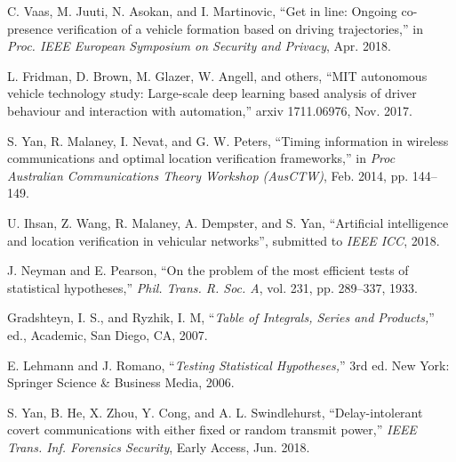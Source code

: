 \documentclass[journal]{IEEEtran}
\begin{document}
\begin{thebibliography}{1}
 C. Vaas, M. Juuti, N. Asokan, and I. Martinovic, ``Get in line: Ongoing co-presence verification of a vehicle formation based on driving trajectories,'' in \textit{Proc. IEEE European Symposium on Security and Privacy}, Apr. 2018.

 L. Fridman, D. Brown, M. Glazer, W. Angell, and others, ``MIT autonomous vehicle technology study: Large-scale deep learning based analysis of driver behaviour and interaction with automation,'' arxiv 1711.06976, Nov. 2017.

 S. Yan, R. Malaney, I. Nevat, and G. W. Peters, ``Timing information in wireless communications and optimal location verification frameworks,'' in \textit{Proc Australian Communications Theory Workshop (AusCTW)}, Feb. 2014, pp. 144--149.

 U. Ihsan, Z. Wang, R. Malaney, A. Dempster, and S. Yan, ``Artificial intelligence and location verification in vehicular networks'', submitted to \textit{IEEE ICC}, 2018.


 J. Neyman and E. Pearson, ``On the problem of the most efficient tests of statistical hypotheses,'' \textit{Phil. Trans. R. Soc. A}, vol. 231, pp. 289--337,  1933.

 Gradshteyn, I. S., and Ryzhik, I. M, ``\textit{Table of Integrals, Series and Products,}''  ed., Academic, San Diego, CA, 2007.

 E. Lehmann and J. Romano, ``\textit{Testing Statistical Hypotheses,}'' 3rd ed. New York: Springer Science \& Business Media, 2006.

 S. Yan, B. He, X. Zhou, Y. Cong, and A. L. Swindlehurst, ``Delay-intolerant covert communications with either fixed or random transmit power,'' \emph{IEEE Trans. Inf. Forensics Security}, Early Access, Jun. 2018.

\end{thebibliography}
\end{document}
